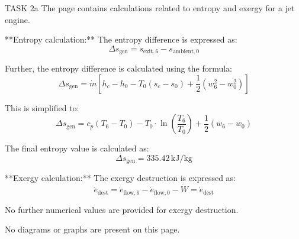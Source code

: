 TASK 2a  
The page contains calculations related to entropy and exergy for a jet engine.  

**Entropy calculation:**  
The entropy difference is expressed as:  
\[
\Delta s_{\text{gen}} = s_{\text{exit},6} - s_{\text{ambient},0}
\]  

Further, the entropy difference is calculated using the formula:  
\[
\Delta s_{\text{gen}} = \dot{m} \left[ h_c - h_0 - T_0 \left( s_c - s_0 \right) + \frac{1}{2} \left( w_6^2 - w_0^2 \right) \right]
\]  

This is simplified to:  
\[
\Delta s_{\text{gen}} = c_p \left( T_6 - T_0 \right) - T_0 \cdot \ln \left( \frac{T_6}{T_0} \right) + \frac{1}{2} \left( w_6 - w_0 \right)
\]  

The final entropy value is calculated as:  
\[
\Delta s_{\text{gen}} = 335.42 \, \text{kJ/kg}
\]  

**Exergy calculation:**  
The exergy destruction is expressed as:  
\[
\dot{e}_{\text{dest}} = \dot{e}_{\text{flow},6} - \dot{e}_{\text{flow},0} - \dot{W} = \dot{e}_{\text{dest}}
\]  

No further numerical values are provided for exergy destruction.  

No diagrams or graphs are present on this page.